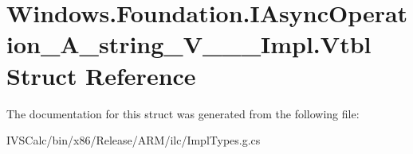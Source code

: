 \hypertarget{struct_windows_1_1_foundation_1_1_i_async_operation___a__string___v_______impl_1_1_vtbl}{}\section{Windows.\+Foundation.\+I\+Async\+Operation\+\_\+\+A\+\_\+string\+\_\+\+V\+\_\+\+\_\+\+\_\+\+Impl.\+Vtbl Struct Reference}
\label{struct_windows_1_1_foundation_1_1_i_async_operation___a__string___v_______impl_1_1_vtbl}


The documentation for this struct was generated from the following file\+:\begin{DoxyCompactItemize}
\item 
I\+V\+S\+Calc/bin/x86/\+Release/\+A\+R\+M/ilc/Impl\+Types.\+g.\+cs\end{DoxyCompactItemize}
